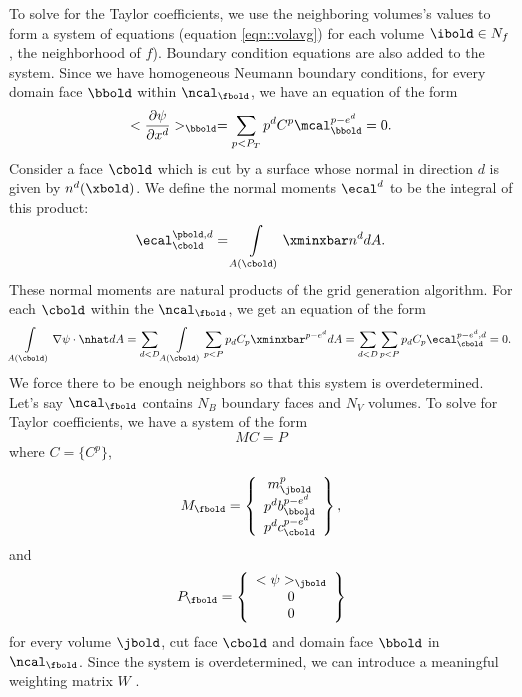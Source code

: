 \documentclass{article}
\begin{document}
{To solve for the Taylor coefficients, we use the neighboring volumes's
values  to form a system of equations (equation \ref{eqn::volavg})
for each volume $\ibold \in N_f$, the neighborhood of $f$).  Boundary
condition equations are also added to the system.   Since we have
homogeneous Neumann boundary conditions, for every domain face $\bbold$
within $\ncal_\fbold$, we have an equation of the form
\begin{equation}
  <\frac{\partial \psi}{\partial x^d}>_\bbold  =
  \sum\limits_{p < P_T} p^d C^{p} \mcal^{p-e^d}_\bbold = 0.
\end{equation}
Consider a face $\cbold$ which is cut by a surface whose
normal in direction $d$ is given by $n^d(\xbold)$.  We define the
normal moments $\ecal^d$ to be the integral of this product:
\begin{equation}
\ecal^{\pbold, d}_\cbold  =  \int\limits_{A(\cbold)} \xminxbar n^d dA.
\label{eqn::normmoment}
\end{equation}
These normal moments are natural products of the \cite{Schwartz2015}
grid generation algorithm. 
For each $\cbold$ within the $\ncal_\fbold$, we get an equation of the form
\begin{equation}
  \int\limits_{A(\cbold)}  \nabla \psi \cdot \nhat dA =
  \sum\limits_{d < D} \int\limits_{A(\cbold)} \sum_{p < P} p_d C_p
  \xminxbar^{p-e^d} dA
  = 
\sum\limits_{d < D} \sum_{p < P}  p_d C_p \ecal^{p-e^d,d}_\cbold = 0.
\end{equation}
We force there to be enough neighbors so that this system is
overdetermined.  Let's say $\ncal_\fbold$ contains $N_B$ boundary faces and
$N_V$ volumes.   To solve for Taylor coefficients, we have a system 
of the form
\begin{equation*}
M C = P 
\end{equation*}
where $C=\{C^p\}$, 

\begin{equation}
  M_\fbold =\left\{
    \begin{array}{c} 
       m^p_\jbold  \\
       p^d b^{p-e^d}_\bbold  \\
       p^d c^{p-e^d}_\cbold  
    \end{array}
 \right\},
\end{equation}
and
\begin{equation}
  P_\fbold =
    \left\{
    \begin{array}{c} 
       <\psi>_\jbold  \\
      0  \\
      0  
    \end{array}
    \right\}
\end{equation}
for every volume $\jbold$, cut face $\cbold$ and domain face $\bbold$
in $\ncal_\fbold$.
Since the system is overdetermined, we can introduce a 
meaningful weighting matrix $W$ \footnotemark[4]. 



}
\end{document}
